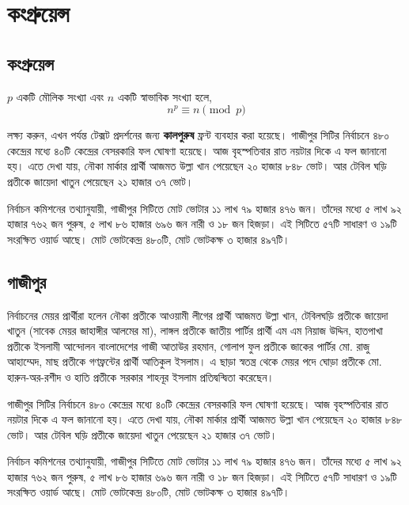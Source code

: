 \documentclass{book}
\begin{document}
\tableofcontents
\chapter{কংগ্রুয়েন্স}
\section{কংগ্রুয়েন্স}
\begin{theorem}[ফার্মার লিটল থিওরেম]
$p$ একটি মৌলিক সংখ্যা এবং $n$ একটি স্বাভাবিক সংখ্যা হলে,
\[n^p\equiv n\pmod{p}\]
\end{theorem}
লক্ষ্য করুন, এখন পর্যন্ত টেক্সট প্রদর্শনের জন্য \textbf{কালপুরুষ} ফ্রন্ট ব্যবহার করা হয়েছে।
গাজীপুর সিটির নির্বাচনে ৪৮০ কেন্দ্রের মধ্যে ৪০টি কেন্দ্রের বেসরকারি ফল ঘোষণা হয়েছে। আজ বৃহস্পতিবার রাত নয়টার দিকে এ ফল জানানো হয়। এতে দেখা যায়, নৌকা মার্কার প্রার্থী আজমত উল্লা খান পেয়েছেন ২০ হাজার ৮৪৮ ভোট। আর টেবিল ঘড়ি প্রতীকে জায়েদা খাতুন পেয়েছেন ২১ হাজার ৩৭ ভোট। 

নির্বাচন কমিশনের তথ্যানুযায়ী, গাজীপুর সিটিতে মোট ভোটার ১১ লাখ ৭৯ হাজার ৪৭৬ জন। তাঁদের মধ্যে ৫ লাখ ৯২ হাজার ৭৬২ জন পুরুষ, ৫ লাখ ৮৬ হাজার ৬৯৬ জন নারী ও ১৮ জন হিজড়া। এই সিটিতে ৫৭টি সাধারণ ও ১৯টি সংরক্ষিত ওয়ার্ড আছে। মোট ভোটকেন্দ্র ৪৮০টি, মোট ভোটকক্ষ ৩ হাজার ৪৯৭টি।

\section{গাজীপুর}
নির্বাচনের মেয়র প্রার্থীরা হলেন নৌকা প্রতীকে আওয়ামী লীগের প্রার্থী আজমত উল্লা খান, টেবিলঘড়ি প্রতীকে জায়েদা খাতুন (সাবেক মেয়র জাহাঙ্গীর আলমের মা), লাঙ্গল প্রতীকে জাতীয় পার্টির প্রার্থী এম এম নিয়াজ উদ্দিন, হাতপাখা প্রতীকে ইসলামী আন্দোলন বাংলাদেশের গাজী আতাউর রহমান, গোলাপ ফুল প্রতীকে জাকের পার্টির মো. রাজু আহাম্মেদ, মাছ প্রতীকে গণফ্রন্টের প্রার্থী আতিকুল ইসলাম। এ ছাড়া স্বতন্ত্র থেকে মেয়র পদে ঘোড়া প্রতীকে মো. হারুন-অর-রশীদ ও হাতি প্রতীকে সরকার শাহনূর ইসলাম প্রতিদ্বন্দ্বিতা করেছেন।

গাজীপুর সিটির নির্বাচনে ৪৮০ কেন্দ্রের মধ্যে ৪০টি কেন্দ্রের বেসরকারি ফল ঘোষণা হয়েছে। আজ বৃহস্পতিবার রাত নয়টার দিকে এ ফল জানানো হয়। এতে দেখা যায়, নৌকা মার্কার প্রার্থী আজমত উল্লা খান পেয়েছেন ২০ হাজার ৮৪৮ ভোট। আর টেবিল ঘড়ি প্রতীকে জায়েদা খাতুন পেয়েছেন ২১ হাজার ৩৭ ভোট। 

নির্বাচন কমিশনের তথ্যানুযায়ী, গাজীপুর সিটিতে মোট ভোটার ১১ লাখ ৭৯ হাজার ৪৭৬ জন। তাঁদের মধ্যে ৫ লাখ ৯২ হাজার ৭৬২ জন পুরুষ, ৫ লাখ ৮৬ হাজার ৬৯৬ জন নারী ও ১৮ জন হিজড়া। এই সিটিতে ৫৭টি সাধারণ ও ১৯টি সংরক্ষিত ওয়ার্ড আছে। মোট ভোটকেন্দ্র ৪৮০টি, মোট ভোটকক্ষ ৩ হাজার ৪৯৭টি।
\end{document}
